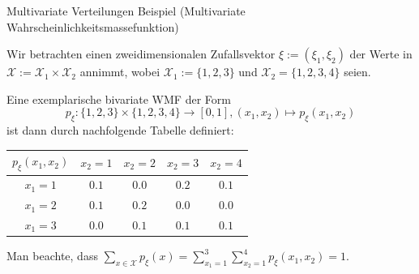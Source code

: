 \documentclass[
  8pt,
  ignorenonframetext,
]{beamer}
\begin{document}
\begin{frame}{Multivariate Verteilungen}
\protect\hypertarget{multivariate-verteilungen-6}{}
Beispiel (Multivariate Wahrscheinlichkeitsmassefunktion)

\vspace{2mm}

\small
\justifying

Wir betrachten einen zweidimensionalen Zufallsvektor
\(\xi:= (\xi_1,\xi_2)\) der Werte in
\(\mathcal{X} := \mathcal{X}_1 \times \mathcal{X}_2\) annimmt, wobei
\(\mathcal{X}_1 := \{1,2,3\}\) und \(\mathcal{X}_2 = \{1,2,3,4\}\)
seien.

Eine exemplarische bivariate WMF der Form \begin{equation}
p_\xi: \{1,2,3\} \times \{1,2,3,4\} \to [0,1], (x_1,x_2) \mapsto p_\xi(x_1,x_2)
\end{equation} ist dann durch nachfolgende Tabelle definiert:
\vspace{1mm}

\begin{table}\label{tab:wmf_bivariat}
\begin{center}
\begin{tabular}{|c|cccc|}
\hline
$p_\xi(x_1,x_2)$    &   $x_2 = 1$   &   $x_2 = 2$   &   $x_2 = 3$   &   $x_2 = 4$   \\\hline
$x_1 = 1$       &   $0.1$       &   $0.0$       &   $0.2$       &   $0.1$       \\
$x_1 = 2$       &   $0.1$       &   $0.2$       &   $0.0$       &   $0.0$       \\
$x_1 = 3$       &   $0.0$       &   $0.1$       &   $0.1$       &   $0.1$       \\\hline
\end{tabular}
\end{center}
\end{table}
\vspace{1mm}

Man beachte, dass
\(\sum_{x \in \mathcal{X}} p_\xi(x) = \sum_{x_1 = 1}^3 \sum_{x_2 = 1}^4 p_\xi(x_1,x_2) = 1\).
\end{frame}
\end{document}
